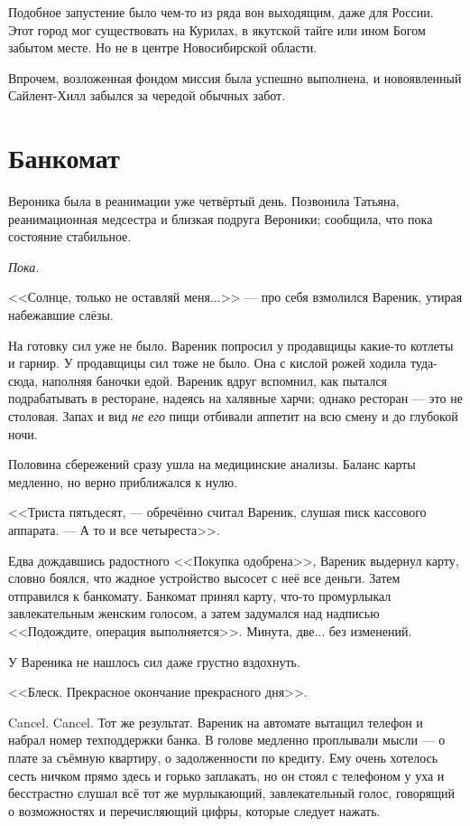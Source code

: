 \documentclass[a4paper,10pt,fleqn]{book}\usepackage{polyglossia}\setdefaultlanguage{english}\setotherlanguage{russian}\defaultfontfeatures{Ligatures=TeX,Mapping=tex-text} \usepackage{xcolor}\definecolor{lightgray}{HTML}{bbbbbb}\color{lightgray}\newcommand{\ml}[3]{\textcolor{black}{#3}}
\begin{document}
Подобное запустение было чем-то из ряда вон выходящим, даже для России.
Этот город мог существовать на Курилах, в якутской тайге или ином Богом забытом месте.
Но не в центре Новосибирской области.

Впрочем, возложенная фондом миссия была успешно выполнена, и новоявленный Сайлент-Хилл забылся за чередой обычных забот.

\section{Банкомат}

Вероника была в реанимации уже четвёртый день.
Позвонила Татьяна, реанимационная медсестра и близкая подруга Вероники;
сообщила, что пока состояние стабильное.

\emph{Пока.}

<<Солнце, только не оставляй меня...>> --- про себя взмолился Вареник, утирая набежавшие слёзы.

На готовку сил уже не было.
Вареник попросил у продавщицы какие-то котлеты и гарнир.
У продавщицы сил тоже не было.
Она с кислой рожей ходила туда-сюда, наполняя баночки едой.
Вареник вдруг вспомнил, как пытался подрабатывать в ресторане, надеясь на халявные харчи;
однако ресторан --- это не столовая.
Запах и вид \emph{не его} пищи отбивали аппетит на всю смену и до глубокой ночи.

Половина сбережений сразу ушла на медицинские анализы.
Баланс карты медленно, но верно приближался к нулю.

<<Триста пятьдесят, --- обречённо считал Вареник, слушая писк кассового аппарата.
--- А то и все четыреста>>.

Едва дождавшись радостного <<Покупка одобрена>>, Вареник выдернул карту, словно боялся, что жадное устройство высосет с неё все деньги.
Затем отправился к банкомату.
Банкомат принял карту, что-то промурлыкал завлекательным женским голосом, а затем задумался над надписью <<Подождите, операция выполняется>>.
Минута, две... без изменений.

У Вареника не нашлось сил даже грустно вздохнуть.

<<Блеск.
Прекрасное окончание прекрасного дня>>.

Cancel. Cancel.
Тот же результат.
Вареник на автомате вытащил телефон и набрал номер техподдержки банка.
В голове медленно проплывали мысли --- о плате за съёмную квартиру, о задолженности по кредиту.
Ему очень хотелось сесть ничком прямо здесь и горько заплакать, но он стоял с телефоном у уха и бесстрастно слушал всё тот же мурлыкающий, завлекательный голос, говорящий о возможностях и перечисляющий цифры, которые следует нажать.
\end{document}
